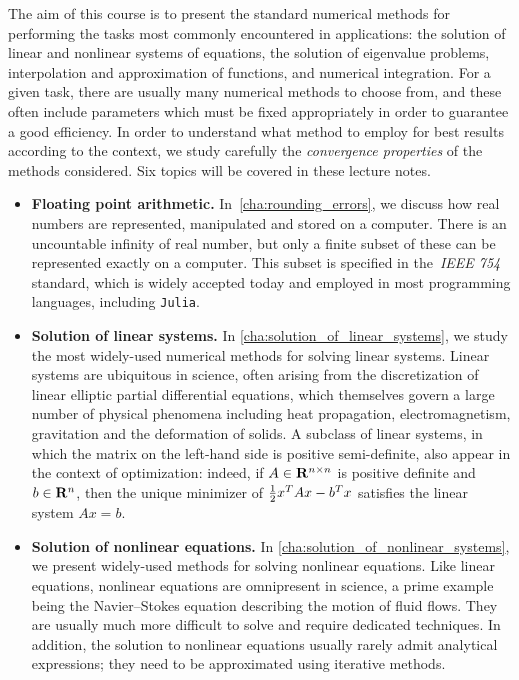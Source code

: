 The aim of this course is to present the standard numerical methods for performing the tasks most commonly encountered in applications:
the solution of linear and nonlinear systems of equations,
the solution of eigenvalue problems,
interpolation and approximation of functions,
and numerical integration.
For a given task,
there are usually many numerical methods to choose from,
and these often include parameters which must be fixed appropriately in order to guarantee a good efficiency.
In order to understand what method to employ for best results according to the context,
we study carefully the \emph{convergence properties} of the methods considered.
Six topics will be covered in these lecture notes.
\begin{itemize}
    \item
        \textbf{Floating point arithmetic.}
        In~\cref{cha:rounding_errors},
        we discuss how real numbers are represented, manipulated and stored on a computer.
        There is an uncountable infinity of real number,
        but only a finite subset of these can be represented exactly on a computer.
        This subset is specified in the~\emph{IEEE 754} standard,
        which is widely accepted today and employed in most programming languages, including \texttt{Julia}.

    \item
        \textbf{Solution of linear systems.}
        In \cref{cha:solution_of_linear_systems},
        we study the most widely-used numerical methods for solving linear systems.
        Linear systems are ubiquitous in science,
        often arising from the discretization of linear elliptic partial differential equations,
        which themselves govern a large number of physical phenomena including heat propagation, electromagnetism, gravitation and the deformation of solids.
        A subclass of linear systems, in which the matrix on the left-hand side is positive semi-definite,
        also appear in the context of optimization:
        indeed, if $A \in \mathbf R^{n \times n}$ is positive definite and $b \in \mathbf R^n$,
        then the unique minimizer of $\frac{1}{2} x^T A x - b^T x$ satisfies the linear system $A x = b$.

    \item
        \textbf{Solution of nonlinear equations.}
        In \cref{cha:solution_of_nonlinear_systems},
        we present widely-used methods for solving nonlinear equations.
        Like linear equations, nonlinear equations are omnipresent in science,
        a prime example being the Navier--Stokes equation describing the motion of fluid flows.
        They are usually much more difficult to solve and require dedicated techniques.
        In addition, the solution to nonlinear equations usually rarely admit analytical expressions;
        they need to be approximated using iterative methods.


\end{itemize}
